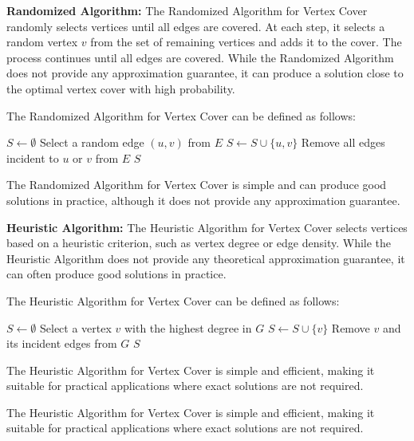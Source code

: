 \textbf{Randomized Algorithm:} The Randomized Algorithm for Vertex Cover randomly selects vertices until all edges are covered. At each step, it selects a random vertex \(v\) from the set of remaining vertices and adds it to the cover. The process continues until all edges are covered. While the Randomized Algorithm does not provide any approximation guarantee, it can produce a solution close to the optimal vertex cover with high probability.

The Randomized Algorithm for Vertex Cover can be defined as follows:
\FloatBarrier
\begin{algorithm}
\caption{Randomized Vertex Cover}
\begin{algorithmic}[1]
\State $S \gets \emptyset$
    \State Select a random edge $(u, v)$ from $E$
    \State $S \gets S \cup \{u, v\}$
    \State Remove all edges incident to $u$ or $v$ from $E$
\EndWhile
\State \Return $S$
\EndFunction
\end{algorithmic}
\end{algorithm}

\FloatBarrier
The Randomized Algorithm for Vertex Cover is simple and can produce good solutions in practice, although it does not provide any approximation guarantee.

\textbf{Heuristic Algorithm:} The Heuristic Algorithm for Vertex Cover selects vertices based on a heuristic criterion, such as vertex degree or edge density. While the Heuristic Algorithm does not provide any theoretical approximation guarantee, it can often produce good solutions in practice.

The Heuristic Algorithm for Vertex Cover can be defined as follows:
\FloatBarrier
\begin{algorithm}
\caption{Heuristic Vertex Cover}
\begin{algorithmic}[1]
\State $S \gets \emptyset$
    \State Select a vertex $v$ with the highest degree in $G$
    \State $S \gets S \cup \{v\}$
    \State Remove $v$ and its incident edges from $G$
\EndWhile
\State \Return $S$
\EndFunction
\end{algorithmic}
\end{algorithm}
\FloatBarrier
The Heuristic Algorithm for Vertex Cover is simple and efficient, making it suitable for practical applications where exact solutions are not required.

The Heuristic Algorithm for Vertex Cover is simple and efficient, making it suitable for practical applications where exact solutions are not required.


